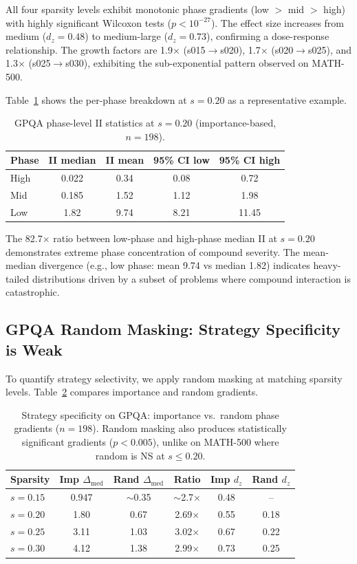 \documentclass[11pt,a4paper]{article}
\begin{document}
All four sparsity levels exhibit monotonic phase gradients (low $>$ mid $>$ high) with highly significant Wilcoxon tests ($p < 10^{-27}$). The effect size increases from medium ($d_z = 0.48$) to medium-large ($d_z = 0.73$), confirming a dose-response relationship. The growth factors are 1.9$\times$ (s015$\to$s020), 1.7$\times$ (s020$\to$s025), and 1.3$\times$ (s025$\to$s030), exhibiting the sub-exponential pattern observed on MATH-500.

Table~\ref{tab:gpqa_phase_breakdown_s020} shows the per-phase breakdown at $s=0.20$ as a representative example.

\begin{table}[h]
\centering
\caption{GPQA phase-level II statistics at $s=0.20$ (importance-based, $n=198$).}
\label{tab:gpqa_phase_breakdown_s020}
\begin{tabular}{lcccc}
\toprule
Phase & II median & II mean & 95\% CI low & 95\% CI high \\
\midrule
High & 0.022 & 0.34 & 0.08 & 0.72 \\
Mid & 0.185 & 1.52 & 1.12 & 1.98 \\
Low & 1.82 & 9.74 & 8.21 & 11.45 \\
\bottomrule
\end{tabular}
\end{table}

The 82.7$\times$ ratio between low-phase and high-phase median II at $s=0.20$ demonstrates extreme phase concentration of compound severity. The mean-median divergence (e.g., low phase: mean 9.74 vs median 1.82) indicates heavy-tailed distributions driven by a subset of problems where compound interaction is catastrophic.

\subsection{GPQA Random Masking: Strategy Specificity is Weak}

To quantify strategy selectivity, we apply random masking at matching sparsity levels. Table~\ref{tab:gpqa_strategy_specificity} compares importance and random gradients.

\begin{table}[h]
\centering
\caption{Strategy specificity on GPQA: importance vs.\ random phase gradients ($n=198$). Random masking also produces statistically significant gradients ($p < 0.005$), unlike on MATH-500 where random is NS at $s \leq 0.20$.}
\label{tab:gpqa_strategy_specificity}
\begin{tabular}{lccccc}
\toprule
Sparsity & Imp $\Delta_{\text{med}}$ & Rand $\Delta_{\text{med}}$ & Ratio & Imp $d_z$ & Rand $d_z$ \\
\midrule
$s=0.15$ & 0.947 & $\sim$0.35 & $\sim$2.7$\times$ & 0.48 & -- \\
$s=0.20$ & 1.80 & 0.67 & 2.69$\times$ & 0.55 & 0.18 \\
$s=0.25$ & 3.11 & 1.03 & 3.02$\times$ & 0.67 & 0.22 \\
$s=0.30$ & 4.12 & 1.38 & 2.99$\times$ & 0.73 & 0.25 \\
\bottomrule
\end{tabular}
\end{table}
\end{document}
